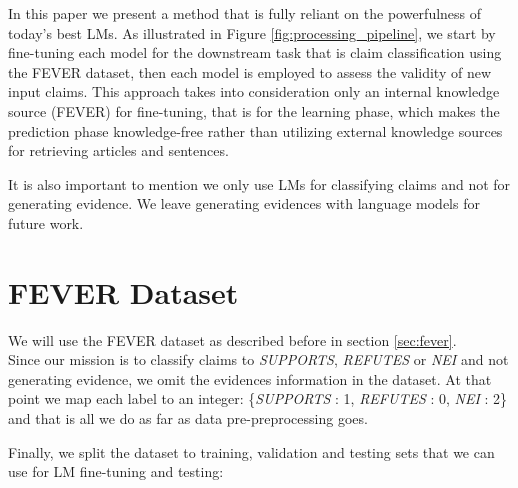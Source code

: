 \documentclass[10pt, english]{report}
\begin{document}
In this paper we present a method that is fully reliant on the powerfulness of today's best LMs. As illustrated in Figure \ref{fig:processing_pipeline}, we start by fine-tuning each model for the downstream task that is claim classification using the FEVER dataset, then each model is employed to assess the validity of new input claims. This approach takes into consideration only an internal knowledge source (FEVER) for fine-tuning, that is for the learning phase, which makes the prediction phase knowledge-free rather than utilizing external knowledge sources for retrieving articles and sentences.

It is also important to mention we only use LMs for classifying claims and not for generating evidence. We leave generating evidences with language models for future work.

\section{FEVER Dataset}
We will use the FEVER dataset as described before in section \ref{sec:fever}.\\
Since our mission is to classify claims to \textit{SUPPORTS}, \textit{REFUTES} or \textit{NEI} and not generating evidence, we omit the evidences information in the dataset. At that point we map each label to an integer: \{\textit{SUPPORTS} : 1, \textit{REFUTES} : 0, \textit{NEI} : 2\} and that is all we do as far as data pre-preprocessing goes.

\begin{table}[htp]
\centering
{}
\vspace{0.4cm}
\caption{Examples of FEVER claims and labels.}
\label{tab:fever_example}
\end{table}

Finally, we split the dataset to training, validation and testing sets that we can use for LM fine-tuning and testing:
\end{document}
